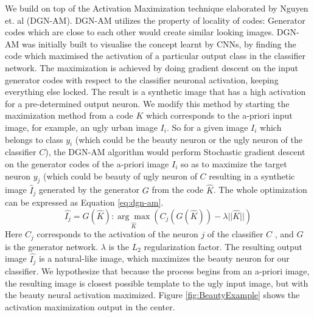 We build on top of the Activation Maximization technique elaborated by Nguyen et. al \cite{nguyen2016synthesizing} (DGN-AM). DGN-AM utilizes the property of locality of codes:%
Generator codes which are close to each other would create similar looking images. DGN-AM was initially built to visualise the concept learnt by CNNs, by finding the code which maximised the activation of a particular output class in the classifier network. %
The maximization is achieved by doing gradient descent on the input generator codes with respect to the classifier neuronal activation, keeping everything else locked. The result is a synthetic image that has a high activation for a pre-determined output neuron.
We modify this method by starting the maximization method from a code $K$ which corresponds to the a-priori input image, for example, an ugly urban image $I_i$. So for a given image $I_i$ which belongs to class $y_i$ (which could be the beauty neuron or the ugly neuron of the classifier $C$), the DGN-AM algorithm would perform Stochastic gradient descent on the generator codes of the a-priori image $I_i$ so as to maximize the target neuron $y_j$ (which could be beauty of ugly neuron of $C$ resulting in a synthetic image $\hat{I}_j$ generated by the generator $G$ from the code $ \hat{K} $. The whole optimization can be expressed as Equation \ref{eq:dgn-am}.
 \begin{equation}
  \hat{I_j}=G( \hat{K} ) : \underset{\hat{K}}{\arg\max}(C_j(G(\hat{K}))-\lambda||\hat{K}||)
  \label{eq:dgn-am}
 \end{equation}
Here $C_j$ corresponds to the activation of the neuron $j$ of the classifier $C$ , and $G$ is the generator network. $\lambda$ is the $L_2$ regularization factor.
The resulting output image $\hat{I_j}$ is a natural-like image, which maximizes the beauty neuron for our classifier. We hypothesize that because the process begins from an a-priori image, the resulting image is closest possible template to the ugly input image, but with the beauty neural activation maximized. Figure \ref{fig:BeautyExample} shows the activation maximization output in the center.
